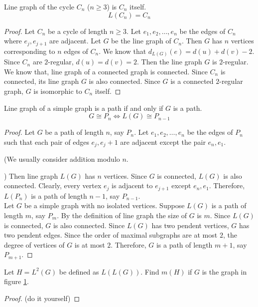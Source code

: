 \begin{exercise}
	Line graph of the cycle $C_n$ ($n \ge 3$) is $C_n$ itself.
	$$ L(C_n) = C_n$$
\end{exercise}
\begin{proof}
	Let $C_n$ be a cycle of length $n \ge 3$. Let $e_1,e_2,\dots,e_n$ be the edges of $C_n$ where $e_j,e_{j+1}$ are adjacent. Let $G$ be the line graph of $C_n$. Then $G$ has $n$ vertices corresponding to $n$ edges of $C_n$. We know that $d_{L(G)}(e) = d(u) + d(v) - 2$. Since $C_n$ are $2$-regular, $d(u) = d(v) = 2$. Then the line graph $G$ is $2$-regular. We know that, line graph of a connected graph is connected. Since $C_n$ is connected, its line graph $G$ is also connected. Since $G$ is a connected $2$-regular graph, $G$ is isomorphic to $C_n$ itself.
\end{proof}

\begin{theorem}
	Line graph of a simple graph is a path if and only if $G$ is a path.
	$$ G \cong P_n \iff L(G) \cong P_{n-1} $$
\end{theorem}
\begin{proof}
	Let $G$ be a path of length $n$, say $P_n$. Let $e_1,e_2,\dots,e_n$ be the edges of $P_n$ such that each pair of edges $e_j,e_j+1$ are adjacent except the pair $e_n,e_1$.
	\begin{commentary} (We usually consider addition modulo $n$.\end{commentary}) Then line graph $L(G)$ has $n$ vertices. Since $G$ is connected, $L(G)$ is also connected. Clearly, every vertex $e_j$ is adjacent to $e_{j+1}$ except $e_n,e_1$. Therefore, $L(P_n)$ is a path of length $n-1$, say $P_{n-1}$.\\

		Let $G$ be a simple graph with no isolated vertices. Suppose $L(G)$ is a path of length $m$, say $P_m$. By the definition of line graph the size of $G$ is $m$. Since $L(G)$ is connected, $G$ is also connected. Since $L(G)$ has two pendent vertices, $G$ has two pendent edges. Since the order of maximal subgraphs are at most $2$, the degree of vertices of $G$ is at most $2$. Therefore, $G$ is a path of length $m+1$, say $P_{m+1}$.
\end{proof}

\begin{exercise}
	Let $H = L^2(G)$ be defined as $L(L(G))$. Find $m(H)$ if $G$ is the graph in figure \ref{dia:L2G}.
\begin{figure}[hbt]
\centering
{}
	\label{dia:L2G}
\end{figure}
\end{exercise}
\begin{proof}
	(do it yourself)
\end{proof}

